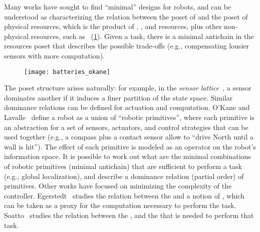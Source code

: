 Many works have sought to find ``minimal'' designs for robots, and
can be understood as characterizing the relation between the poset
of  and the poset of physical resources, which is the product
of , , and  resources,
plus other non-physical resources, such as ~(\cref{fig:robot-generic}).
Given a task, there is a minimal antichain in the resources poset
that describes the possible trade-offs (e.g., compensating lousier
sensors with more computation).

\begin{figure}
  \centering
  \texttt{[image: batteries\_okane]}
  \caption{}
  \label{fig:robot-generic}
\end{figure}

\begin{figure}
  \centering
  \caption{}
\end{figure}



The poset structure arises naturally: for example, in the \emph{sensor
lattice}~\cite{lavalle12sensing}, a sensor dominates another
if it induces a finer partition of the state space. Similar dominance
relations can be defined for actuation and computation. O'Kane and
Lavalle~\cite{okane08comparing} define a robot as a union of ``robotic
primitives'', where each primitive is an abstraction for a set of
sensors, actuators, and control strategies that can be used together
(e.g., a compass plus a contact sensor allow to ``drive North until
a wall is hit''). The effect of each primitive is modeled as an operator
on the robot's information space. It is possible to work out what
are the minimal combinations of robotic primitives (minimal antichain)
that are sufficient to perform a task (e.g., global localization),
and describe a dominance relation (partial order) of primitives. Other
works have focused on minimizing the complexity of the controller.
Egerstedt~\cite{egerstedt03motion} studies the relation between
the  and a notion of , which can be taken as
a proxy for the computation necessary to perform the task. Soatto~\cite{soatto11steps}
studies the relation between the ,
and the  that is needed to perform that
task.



\begin{example}
\end{example}

